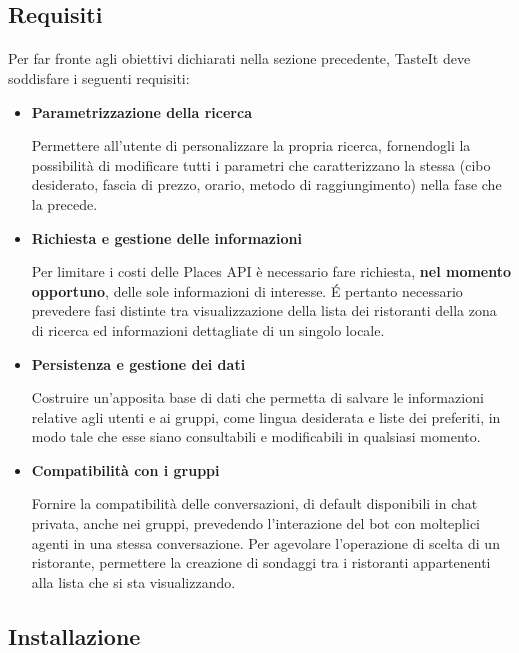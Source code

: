 \documentclass[a4paper, 12pt]{article}
\begin{document}
	\newpage
	\subsection{Requisiti}
	\paragraph{}
	Per far fronte agli obiettivi dichiarati nella sezione precedente, TasteIt deve soddisfare i seguenti requisiti:
	\begin{itemize}
		\item \textbf{Parametrizzazione della ricerca}
		
		Permettere all'utente di personalizzare la propria ricerca, fornendogli la possibilità di modificare tutti i parametri che caratterizzano la stessa (cibo desiderato, fascia di prezzo, orario, metodo di raggiungimento) nella fase che la precede.
		
		\item \textbf{Richiesta e gestione delle informazioni}
		
		Per limitare i costi delle Places API è necessario fare richiesta, \textbf{nel momento opportuno}, delle sole informazioni di interesse. É pertanto necessario prevedere fasi distinte tra visualizzazione della lista dei ristoranti della zona di ricerca ed informazioni dettagliate di un singolo locale.
		
		\item \textbf{Persistenza e gestione dei dati}
		
		Costruire un'apposita base di dati che permetta di salvare le informazioni relative agli utenti e ai gruppi, come lingua desiderata e liste dei preferiti, in modo tale che esse siano consultabili e modificabili in qualsiasi momento.
		
		\item \textbf{Compatibilità con i gruppi}
		
		Fornire la compatibilità delle conversazioni, di default disponibili in chat privata, anche nei gruppi, prevedendo l'interazione del bot con molteplici agenti in una stessa conversazione. Per agevolare l'operazione di scelta di un ristorante, permettere la creazione di sondaggi tra i ristoranti appartenenti alla lista che si sta visualizzando.
	\end{itemize}
	
	\newpage
	\subsection{Installazione}
\end{document}
